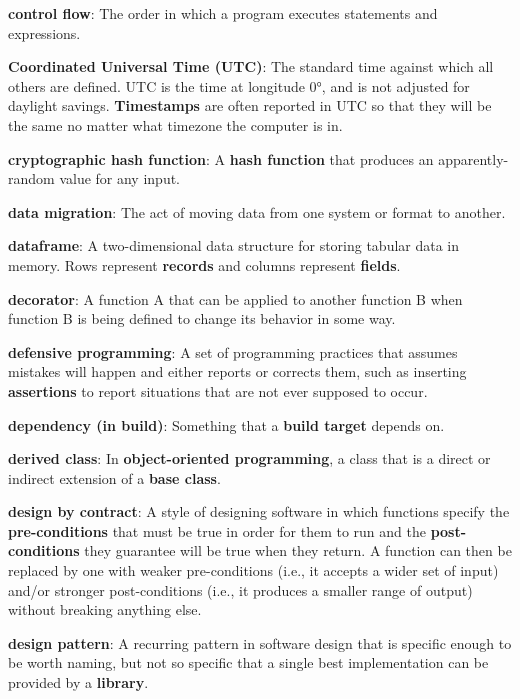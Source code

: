 \documentclass{scrbook}
\newcommand{\glosskey}[1]{\textbf{#1}}
\begin{document}
\noindent \textbf{\glosskey{control flow}}: 
The order in which a program executes statements and expressions.


\noindent \textbf{\glosskey{Coordinated Universal Time} (UTC)}: 
The standard time against which all others are defined. UTC is the time at longitude 0°, and is not adjusted for daylight savings. \glosskey{Timestamps} are often reported in UTC so that they will be the same no matter what timezone the computer is in.


\noindent \textbf{\glosskey{cryptographic hash function}}: 
A \glosskey{hash function} that produces an apparently-random value for any input.


\noindent \textbf{\glosskey{data migration}}: 
The act of moving data from one system or format to another.


\noindent \textbf{\glosskey{dataframe}}: 
A two-dimensional data structure for storing tabular data in memory. Rows represent \glosskey{records} and columns represent \glosskey{fields}.


\noindent \textbf{\glosskey{decorator}}: 
A function A that can be applied to another function B when function B is being defined to change its behavior in some way.


\noindent \textbf{\glosskey{defensive programming}}: 
A set of programming practices that assumes mistakes will happen and either reports or corrects them, such as inserting \glosskey{assertions} to report situations that are not ever supposed to occur.


\noindent \textbf{\glosskey{dependency (in build)}}: 
Something that a \glosskey{build target} depends on.


\noindent \textbf{\glosskey{derived class}}: 
In \glosskey{object-oriented programming}, a class that is a direct or indirect extension of a \glosskey{base class}.


\noindent \textbf{\glosskey{design by contract}}: 
A style of designing software in which functions specify the \glosskey{pre-conditions} that must be true in order for them to run and the \glosskey{post-conditions} they guarantee will be true when they return. A function can then be replaced by one with weaker pre-conditions (i.e., it accepts a wider set of input) and/or stronger post-conditions (i.e., it produces a smaller range of output) without breaking anything else.


\noindent \textbf{\glosskey{design pattern}}: 
A recurring pattern in software design that is specific enough to be worth naming, but not so specific that a single best implementation can be provided by a \glosskey{library}.
\end{document}
